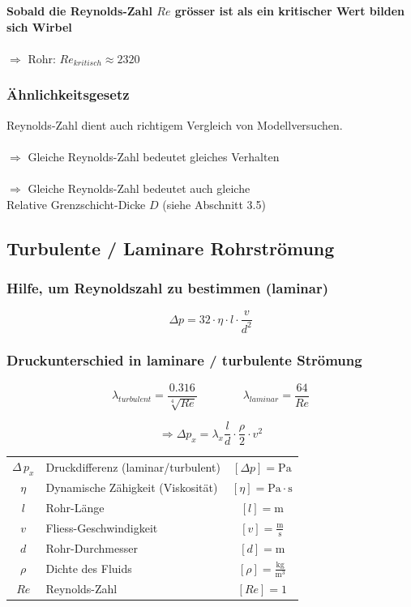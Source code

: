 \textbf{Sobald die Reynolds-Zahl $Re$ grösser ist als ein kritischer Wert bilden sich Wirbel} \\
\\
$\Rightarrow$ Rohr:  $Re_{kritisch} \approx 2320$


\subsubsection{Ähnlichkeitsgesetz}
Reynolds-Zahl dient auch richtigem Vergleich von Modellversuchen. \\
\\
$\Rightarrow$ Gleiche Reynolds-Zahl bedeutet gleiches Verhalten \\
\\
$\Rightarrow$ Gleiche Reynolds-Zahl bedeutet auch gleiche \\
 Relative Grenzschicht-Dicke $D$ (siehe Abschnitt 3.5)



\vfill\null
\columnbreak


\subsection{Turbulente / Laminare Rohrströmung}

\subsubsection{Hilfe, um Reynoldszahl zu bestimmen (laminar)}

$$ \boxed{ \Delta p = 32 \cdot \eta \cdot l \cdot \frac{v}{d^2} }  $$


\subsubsection{Druckunterschied in laminare / turbulente Strömung}

$$ \lambda_{turbulent} = \frac{0.316}{\sqrt[4]{Re}}  \qquad \qquad \lambda_{laminar} = \frac{64}{Re}  $$

$$ \boxed{ \Rightarrow \Delta p_x = \lambda_x \frac{l}{d} \cdot \frac{\rho}{2} \cdot v^2 } $$



\begin{tabular}{c l c}
		$\Delta \, p_x$ & Druckdifferenz (laminar/turbulent) & $[\Delta p] = \mathrm{Pa}$ \\
		$\eta$ & Dynamische Zähigkeit (Viskosität) & $[\eta] = \mathrm{Pa \cdot s}$  \\
		$l$ & Rohr-Länge & $[l] = \mathrm{m}$ \\
		\rule{0pt}{8pt}$v$ & Fliess-Geschwindigkeit & $[v] = \mathrm{\frac{m}{s}}$ \\
		$d$ & Rohr-Durchmesser & $[d] = \mathrm{m}$ \\		
		\rule{0pt}{8pt}$\rho$ & Dichte des Fluids & $[\rho] = \mathrm{\frac{kg}{m^3}}$ \\
		$Re$ & Reynolds-Zahl & $[Re] = 1$ \\
\end{tabular}




